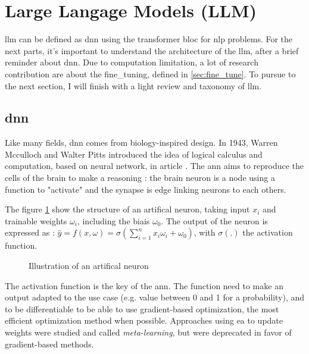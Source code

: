\section{Large Langage Models (LLM)}
\label{sec:llm}
\acrshort{llm} can be defined as \acrfull{dnn} using the \Gls{transformer} bloc for \acrfull{nlp} problems. For the next parts, it's important to understand the architecture of the \acrshort{llm}, after a brief reminder about \acrshort{dnn}. Due to computation limitation, a lot of research contribution are about the \Gls{fine_tuning}, defined in \ref{sec:fine_tune}. To pursue to the next section, I will finish with a light review and taxonomy of \acrshort{llm}. 

\subsection{\acrfull{dnn}}
\label{sec:dnn}
Like many fields, \acrshort{dnn} comes from biology-inspired design. In 1943,  Warren Mcculloch and Walter Pitts introduced the idea of logical calculus and computation, based on neural network, in article \cite{mcculloch_logical_1943}. The \acrfull{ann} aims to reproduce the cells of the brain to make a reasoning : the brain neuron is a node using a function to "activate" and the synapse is edge linking neurons to each others.  


The figure \ref{fig:artifical_neuron} show the structure of an artifical neuron, taking input $x_i$ and trainable weights $\omega_i$, including the biais $\omega_0$. The output of the neuron is expressed as : $\hat{y} = f(x,\omega) =  \sigma(\sum_{i=1}^n x_i \omega_i +\omega_0)$, with $\sigma(.)$ the activation function.

\begin{figure}[h]
    \centering
    
    \caption{Illustration of an artifical neuron}
    \label{fig:artifical_neuron}
\end{figure}


The activation function is the key of the \acrshort{ann}. The function need to make an output adapted to the use case (e.g. value between 0 and 1 for a probability), and to be differentiable to be able to use gradient-based optimization, the most efficient optimization method when possible. Approaches using \acrfull{ea} to update weights were studied and called \textit{meta-learning}\cite{hospedales_meta-learning_2022}, but were deprecated in favor of gradient-based methods. 

